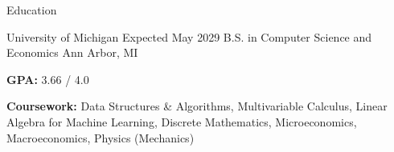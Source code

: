 \documentclass[
	11pt
]{../../../template}
\begin{document}
	\begin{rSection}{E}{ducation}
		\begin{rSectionEntry}
			{University of Michigan}
			{Expected May 2029}
			{B.S. in Computer Science and Economics}
			{}
			{Ann Arbor, MI}

			\item \textbf{GPA:} 3.66 / 4.0
			\item \textbf{Coursework:} Data Structures \& Algorithms, Multivariable Calculus, Linear Algebra for Machine Learning, Discrete Mathematics, Microeconomics, Macroeconomics, Physics (Mechanics)
		\end{rSectionEntry}
	\end{rSection}

\end{document}
